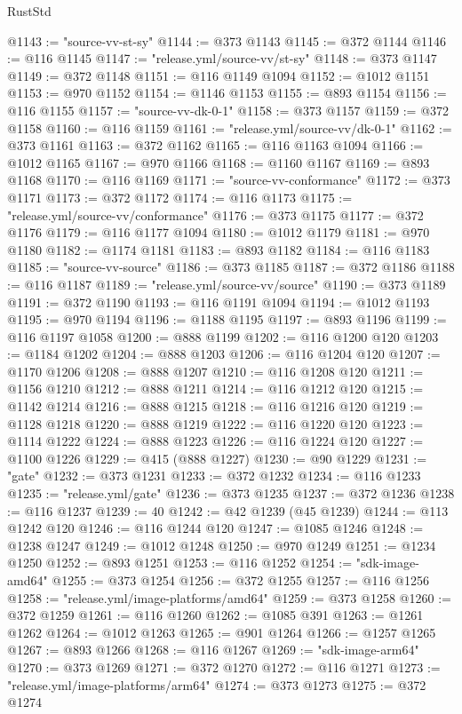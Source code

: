 \begin{lexlean}{RustStd}
\begin{coremodule}
@1143 := "source-vv-st-sy"
@1144 := @373 @1143
@1145 := @372 @1144
@1146 := @116 @1145
@1147 := "release.yml/source-vv/st-sy"
@1148 := @373 @1147
@1149 := @372 @1148
@1151 := @116 @1149 @1094
@1152 := @1012 @1151
@1153 := @970 @1152
@1154 := @1146 @1153
@1155 := @893 @1154
@1156 := @116 @1155
@1157 := "source-vv-dk-0-1"
@1158 := @373 @1157
@1159 := @372 @1158
@1160 := @116 @1159
@1161 := "release.yml/source-vv/dk-0-1"
@1162 := @373 @1161
@1163 := @372 @1162
@1165 := @116 @1163 @1094
@1166 := @1012 @1165
@1167 := @970 @1166
@1168 := @1160 @1167
@1169 := @893 @1168
@1170 := @116 @1169
@1171 := "source-vv-conformance"
@1172 := @373 @1171
@1173 := @372 @1172
@1174 := @116 @1173
@1175 := "release.yml/source-vv/conformance"
@1176 := @373 @1175
@1177 := @372 @1176
@1179 := @116 @1177 @1094
@1180 := @1012 @1179
@1181 := @970 @1180
@1182 := @1174 @1181
@1183 := @893 @1182
@1184 := @116 @1183
@1185 := "source-vv-source"
@1186 := @373 @1185
@1187 := @372 @1186
@1188 := @116 @1187
@1189 := "release.yml/source-vv/source"
@1190 := @373 @1189
@1191 := @372 @1190
@1193 := @116 @1191 @1094
@1194 := @1012 @1193
@1195 := @970 @1194
@1196 := @1188 @1195
@1197 := @893 @1196
@1199 := @116 @1197 @1058
@1200 := @888 @1199
@1202 := @116 @1200 @120
@1203 := @1184 @1202
@1204 := @888 @1203
@1206 := @116 @1204 @120
@1207 := @1170 @1206
@1208 := @888 @1207
@1210 := @116 @1208 @120
@1211 := @1156 @1210
@1212 := @888 @1211
@1214 := @116 @1212 @120
@1215 := @1142 @1214
@1216 := @888 @1215
@1218 := @116 @1216 @120
@1219 := @1128 @1218
@1220 := @888 @1219
@1222 := @116 @1220 @120
@1223 := @1114 @1222
@1224 := @888 @1223
@1226 := @116 @1224 @120
@1227 := @1100 @1226
@1229 := @415 (@888 @1227)
@1230 := @90 @1229
@1231 := "gate"
@1232 := @373 @1231
@1233 := @372 @1232
@1234 := @116 @1233
@1235 := "release.yml/gate"
@1236 := @373 @1235
@1237 := @372 @1236
@1238 := @116 @1237
@1239 := 40
@1242 := @42 @1239 (@45 @1239)
@1244 := @113 @1242 @120
@1246 := @116 @1244 @120
@1247 := @1085 @1246
@1248 := @1238 @1247
@1249 := @1012 @1248
@1250 := @970 @1249
@1251 := @1234 @1250
@1252 := @893 @1251
@1253 := @116 @1252
@1254 := "sdk-image-amd64"
@1255 := @373 @1254
@1256 := @372 @1255
@1257 := @116 @1256
@1258 := "release.yml/image-platforms/amd64"
@1259 := @373 @1258
@1260 := @372 @1259
@1261 := @116 @1260
@1262 := @1085 @391
@1263 := @1261 @1262
@1264 := @1012 @1263
@1265 := @901 @1264
@1266 := @1257 @1265
@1267 := @893 @1266
@1268 := @116 @1267
@1269 := "sdk-image-arm64"
@1270 := @373 @1269
@1271 := @372 @1270
@1272 := @116 @1271
@1273 := "release.yml/image-platforms/arm64"
@1274 := @373 @1273
@1275 := @372 @1274

\end{coremodule}
\end{lexlean}
